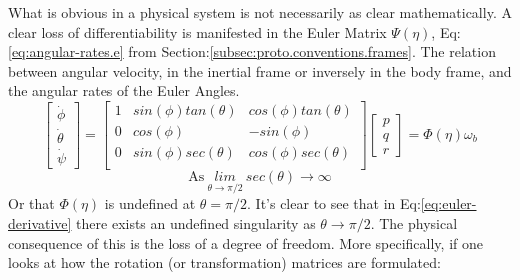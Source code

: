\par
What is obvious in a physical system is not necessarily as clear mathematically. A clear loss of differentiability is manifested in the Euler Matrix $\Psi(\eta)$, Eq:\ref{eq:angular-rates.e} from Section:\ref{subsec:proto.conventions.frames}. The relation between angular velocity, in the inertial frame or inversely in the body frame, and the angular rates of the Euler Angles.
\begin{equation}\label{eq:euler-derivative}
\begin{bmatrix}
\dot{\phi}\\
\dot{\theta}\\
\dot{\psi}
\end{bmatrix}
=\begin{bmatrix}
1 & sin(\phi)tan(\theta) & cos(\phi)tan(\theta)\\
0 & cos(\phi) & -sin(\phi)\\
0 & sin(\phi)sec(\theta) & cos(\phi)sec(\theta)\\
\end{bmatrix}
\begin{bmatrix}
p\\
q\\
r
\end{bmatrix}
=\Phi(\eta)\omega_b
\end{equation}
\begin{equation}
\text{As}~\underset{{\theta \rightarrow \pi /2}}{lim}~sec(\theta)\rightarrow \infty
\end{equation}
Or that $\Phi(\eta)$ is undefined at $\theta=\pi/2$. 
It's clear to see that in Eq:\ref{eq:euler-derivative} there exists an undefined singularity as $\theta\rightarrow\pi/2$. The physical consequence of this is the loss of a degree of freedom. More specifically, if one looks at how the rotation (or transformation) matrices are formulated:
